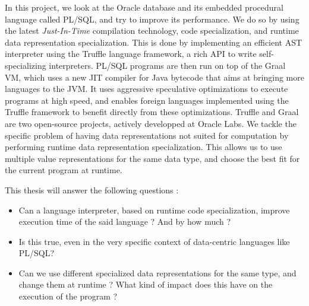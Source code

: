 \documentclass[twoside,11pt,a4paper]{article}
\begin{document}
In this project, we look at the Oracle database and its embedded procedural language called PL/SQL, and try to improve its performance. We do so by using the latest \textit{Just-In-Time} compilation technology, code specialization, and runtime data representation specialization. This is done by implementing an efficient AST interpreter using the Truffle language framework, a rich API to write self-specializing interpreters. PL/SQL programs are then run on top of the Graal VM, which uses a new JIT compiler for Java bytecode that aims at bringing more languages to the JVM. It uses aggressive speculative optimizations to execute programs at high speed, and enables foreign languages implemented using the Truffle framework to benefit directly from these optimizations. Truffle and Graal are two open-source projects, actively developped at Oracle Labs. We tackle the specific problem of having data representations not suited for computation by performing runtime data representation specialization. This allows us to use multiple value representations for the same data type, and choose the best fit for the current program at runtime.

This thesis will answer the following questions :
\begin{itemize}
\item Can a language interpreter, based on runtime code specialization, improve execution time of the said language ? And by how much ?
\item Is this true, even in the very specific context of data-centric languages like PL/SQL?
\item Can we use different specialized data representations for the same type, and change them at runtime ? What kind of impact does this have on the execution of the program ?
\end{itemize}
\end{document}

